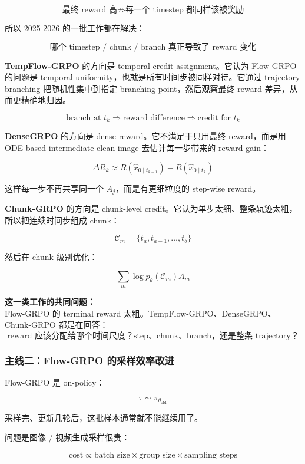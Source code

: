 \[
\text{最终 reward 高}
\not\Rightarrow
\text{每一个 timestep 都同样该被奖励}
\]

所以 2025-2026 的一批工作都在解决：

\[
\text{哪个 timestep / chunk / branch 真正导致了 reward 变化}
\]

\textbf{TempFlow-GRPO} 的方向是 temporal credit assignment。它认为 Flow-GRPO 的问题是 temporal uniformity，也就是所有时间步被同样对待。它通过 trajectory branching 把随机性集中到指定 branching point，然后观察最终 reward 差异，从而更精确地归因。

\[
\text{branch at } t_k
\Rightarrow
\text{reward difference}
\Rightarrow
\text{credit for } t_k
\]

\textbf{DenseGRPO} 的方向是 dense reward。它不满足于只用最终 reward，而是用 ODE-based intermediate clean image 去估计每一步带来的 reward gain：

\[
\Delta R_k
\approx
R(\hat{x}_{0\mid t_{k-1}})
-
R(\hat{x}_{0\mid t_k})
\]

这样每一步不再共享同一个 $A_j$，而是有更细粒度的 step-wise reward。

\textbf{Chunk-GRPO} 的方向是 chunk-level credit。它认为单步太细、整条轨迹太粗，所以把连续时间步组成 chunk：

\[
\mathcal{C}_m
=
\{t_a,t_{a-1},\ldots,t_b\}
\]

然后在 chunk 级别优化：

\[
\sum_m
\log p_\theta(\mathcal{C}_m)
A_m
\]

\begin{summarybox}
\textbf{这一类工作的共同问题：}\\
Flow-GRPO 的 terminal reward 太粗。TempFlow-GRPO、DenseGRPO、Chunk-GRPO 都是在回答：
\[
\text{reward 应该分配给哪个时间尺度？step、chunk、branch，还是整条 trajectory？}
\]
\end{summarybox}

\subsubsection{主线二：Flow-GRPO 的采样效率改进}

Flow-GRPO 是 on-policy：

\[
\tau\sim\pi_{\theta_\text{old}}
\]

采样完、更新几轮后，这批样本通常就不能继续用了。

问题是图像 / 视频生成采样很贵：

\[
\text{cost}
\propto
\text{batch size}
\times
\text{group size}
\times
\text{sampling steps}
\]


